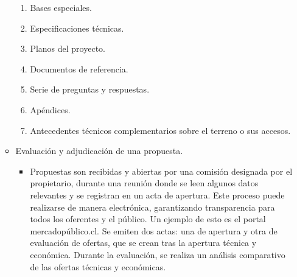 \documentclass{article} %
\begin{document}
\begin{itemize}[label={},left=0pt,align=parleft]
\begin{itemize}[label={},left=1em,align=parleft]
\begin{enumerate}
            \item \begin{highlightbox}[levelfour] Bases especiales. \end{highlightbox}
            \item \begin{highlightbox}[levelfour] Especificaciones técnicas. \end{highlightbox}
            \item \begin{highlightbox}[levelfour] Planos del proyecto. \end{highlightbox}
            \item \begin{highlightbox}[levelfour] Documentos de referencia. \end{highlightbox}
            \item \begin{highlightbox}[levelfour] Serie de preguntas y respuestas. \end{highlightbox}
            \item \begin{highlightbox}[levelfour] Apéndices. \end{highlightbox}
            \item \begin{highlightbox}[levelfour] Antecedentes técnicos complementarios sobre el terreno o sus accesos. \end{highlightbox}
        \end{enumerate}
        \item \begin{highlightbox}[leveltwo] Evaluación y adjudicación de una propuesta. \end{highlightbox}
        \begin{itemize}[label={},left=2em,align=parleft]
            \item \begin{highlightbox}[levelthree] Propuestas son recibidas y abiertas por una comisión designada por el propietario, durante una reunión donde se leen algunos datos relevantes y se registran en un acta de apertura. Este proceso puede realizarse de manera electrónica, garantizando transparencia para todos los oferentes y el público. Un ejemplo de esto es el portal mercadopúblico.cl. Se emiten dos actas: una de apertura y otra de evaluación de ofertas, que se crean tras la apertura técnica y económica. Durante la evaluación, se realiza un análisis comparativo de las ofertas técnicas y económicas. \end{highlightbox}

\end{itemize}
\end{itemize}
\end{itemize}
\end{document}
